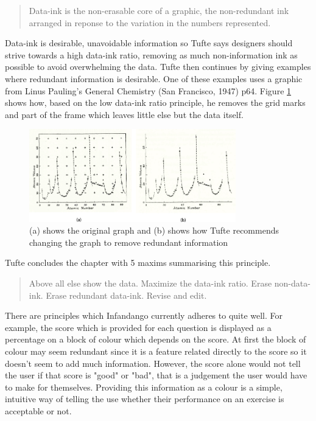 \begin{quote}Data-ink is the non-erasable core of a graphic, the non-redundant ink arranged in reponse to the variation in the numbers represented.
\end{quote}
Data-ink is desirable, unavoidable information so Tufte says designers should strive towards a high data-ink ratio, removing as much non-information ink as possible to avoid overwhelming the data. Tufte then continues by giving examples where redundant information is desirable. One of these examples uses a graphic from Linus Pauling's General Chemistry (San Francisco, 1947) p64. Figure \ref{fig:tuftegraphs} shows how, based on the low data-ink ratio principle, he removes the grid marks and part of the frame which leaves little else but the data itself.

\begin{figure}[h!]
\centering
\includegraphics[width=0.8\textwidth]{images/tuftegraphs.png}
\caption{(a) shows the original graph and (b) shows how Tufte recommends changing the graph to remove redundant information}
\label{fig:tuftegraphs}
\end{figure}


Tufte concludes the chapter with 5 maxims summarising this principle.

\begin{verse}
	Above all else show the data.
	Maximize the data-ink ratio.
	Erase non-data-ink.
	Erase redundant data-ink.
	Revise and edit.
\end{verse}

There are principles which Infandango currently adheres to quite well. For example, the score which is provided for each question is displayed as a percentage on a block of colour which depends on the score. At first the block of colour may seem redundant since it is a feature related directly to the score so it doesn't seem to add much information. However, the score alone would not tell the user if that score is "good" or "bad", that is a judgement the user would have to make for themselves. Providing this information as a colour is a simple, intuitive way of telling the use whether their performance on an exercise is acceptable or not.

